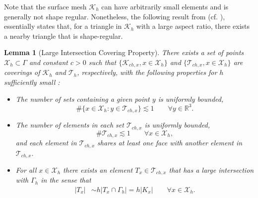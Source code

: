 \documentclass[10pt, a4paper]{amsart}
\newcommand{\bbR}{\mathbb{R}}
\newcommand{\calT}{\mathcal{T}}
\newcommand{\calK}{\mathcal{K}}
\newcommand{\calX}{\mathcal{X}}
\newtheorem{lemma}[theorem]{Lemma}
\theoremstyle{definition}
\theoremstyle{remark}
\theoremstyle{example}
\numberwithin{equation}{section}
\begin{document}
Note that the surface mesh $\calK_h$ can
have arbitrarily small elements and is generally not 
shape regular. Nonetheless, the following result from (cf. \cite[(5.1)--(5.4)]{burman2017cut}), essentially states that, for a triangle
in $\calK_h$ with a large aspect ratio, there exists 
a nearby triangle that is shape-regular.
\begin{lemma}[Large Intersection Covering Property]
There exists a set of points $\calX_h\subset \Gamma$ 
and constant $c>0$ such that
$\{\calK_{ch, x}, x \in \calX_h\}$ and $\{\calT_{c h, x}, x \in \calX_h\}$ are coverings of $\calK_h$ and $\calT_h$, respectively, with the following properties for $h$ sufficiently small :
\begin{itemize}
\item The number of sets containing a given point $y$ is uniformly bounded,
\[
\#\{x \in \calX_h: y \in \calT_{ch, x}\} \lesssim 1 \qquad \forall y \in \bbR^3.
\]

\item The number of elements in each set $\calT_{ch, x}$ is uniformly bounded,
\[
\#\calT_{ch, x} \lesssim 1 \qquad \forall x \in \calX_h,
\]
and each element in $\calT_{ch, x}$ shares at least one face with another element in $\calT_{ch, x}$.

\item For all $x \in \calX_h$ there exists an element $T_x \in \calT_{ch, x}$ that has a large intersection with $\Gamma_h$ in the sense that
\begin{align}
|T_x|
& \sim h|T_x \cap \Gamma_h| = h|K_x| \qquad \forall x \in \calX_h. \label{large-intersect}
\end{align}
\end{itemize}
\end{lemma}



\end{document}
